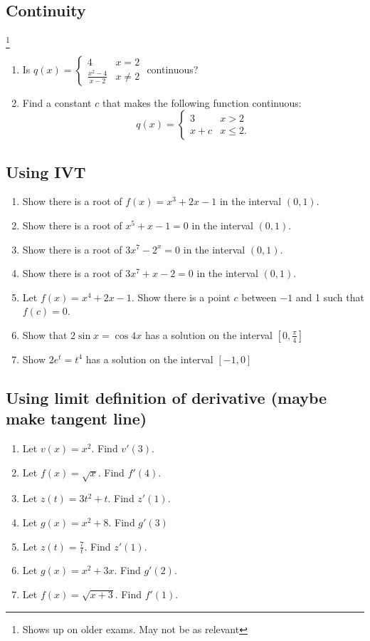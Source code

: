 \documentclass[11pt]{scrartcl}
\begin{document}
\subsection{Continuity}
\footnote{Shows up on older exams. May not be as relevant}
\begin{enumerate}
\item Is $q(x) = \begin{cases} 4 & x = 2 \\ \frac{x^2 - 4}{x-2} & x \ne 2 \end{cases}$ continuous?
\item Find a constant $c$ that makes the following function continuous:
  \[
    q(x) = \begin{cases} 3 & x > 2 \\ x + c & x \le 2. \end{cases}
  \]
\end{enumerate}

\subsection{Using IVT}
\begin{enumerate}
\item Show there is a root of $f(x) = x^3 + 2x - 1$ in the interval $(0, 1)$.
\item Show there is a root of $x^5 + x - 1 = 0$ in the interval $(0, 1)$.
\item Show there is a root of $3x^7 - 2^x = 0$ in the interval $(0, 1)$.
\item Show there is a root of $3x^7 + x - 2 = 0$ in the interval $(0, 1)$.
\item Let $f(x) = x^4 + 2x - 1$. Show there is a point $c$ between $-1$ and 1 such that $f(c) = 0$.
\item Show that $2\sin x = \cos 4x$ has a solution on the interval $[0, \tfrac{\pi}{4}]$
\item Show $2e^t = t^4$ has a solution on the interval $[-1, 0]$
\end{enumerate}

\subsection{Using limit definition of derivative (maybe make tangent line)}
\begin{enumerate}
\item Let $v(x) = x^2$. Find $v'(3)$.
\item Let $f(x) = \sqrt{x}$. Find $f'(4)$.
\item Let $z(t) = 3t^2 + t$. Find $z'(1)$.
\item Let $g(x) = x^2 + 8$. Find $g'(3)$
\item Let $z(t) = \frac{7}{t}$. Find $z'(1)$.
\item Let $g(x) = x^2 + 3x$. Find $g'(2)$.
\item Let $f(x) = \sqrt{x + 3}$. Find $f'(1)$.
\end{enumerate}
\end{document}
